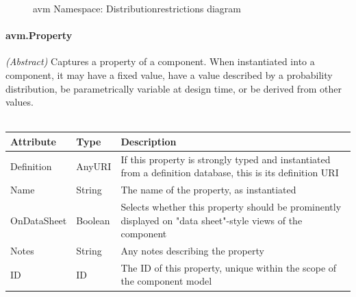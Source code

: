 \begin{figure}[h!]
\caption{avm Namespace: Distributionrestrictions diagram}
\label{Restriction_diagram}
\end{figure}

\paragraph{avm.Property}
\textit{(Abstract)} Captures a property of a component. When instantiated into a component, it may have a fixed value, have a value described by a probability distribution, be parametrically variable at design time, or be derived from other values.
\\ \\
\begin{tabular}{ l l p{12cm} }
\textbf{Attribute} & \textbf{Type} & \textbf{Description} \\ \hline
Definition & AnyURI & If this property is strongly typed and instantiated from a definition database, this is its definition URI \\ \hline
Name & String & The name of the property, as instantiated \\ \hline
OnDataSheet & Boolean & Selects whether this property should be prominently displayed on "data sheet"-style views of the component \\ \hline
Notes & String & Any notes describing the property \\ \hline
ID & ID & The ID of this property, unique within the scope of the component model \\ \hline
\end{tabular}

